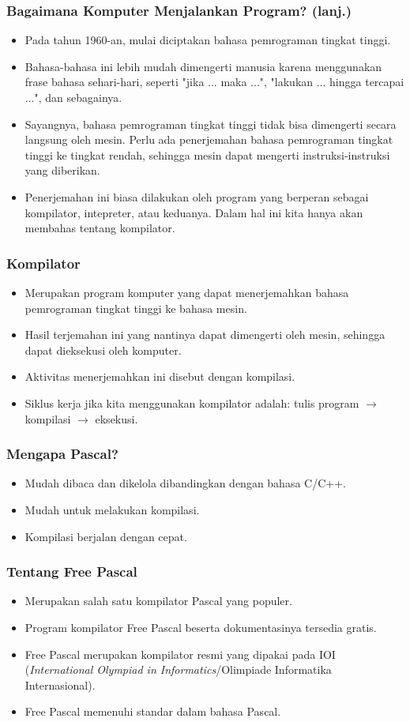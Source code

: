 \documentclass{beamer}
\begin{document}
\begin{frame}
\frametitle{Bagaimana Komputer Menjalankan Program? (lanj.)}
\begin{itemize}
	\item Pada tahun 1960-an, mulai diciptakan bahasa pemrograman tingkat tinggi.
	\item Bahasa-bahasa ini lebih mudah dimengerti manusia karena menggunakan frase bahasa sehari-hari, seperti "jika ... maka ...", "lakukan ... hingga tercapai ...", dan sebagainya.
	\item Sayangnya, bahasa pemrograman tingkat tinggi tidak bisa dimengerti secara langsung oleh mesin. Perlu ada penerjemahan bahasa pemrograman tingkat tinggi ke tingkat rendah, sehingga mesin dapat mengerti instruksi-instruksi yang diberikan.
	\item Penerjemahan ini biasa dilakukan oleh program yang berperan sebagai kompilator, intepreter, atau keduanya. Dalam hal ini kita hanya akan membahas tentang kompilator.
\end{itemize}
\end{frame}

\begin{frame}
\frametitle{Kompilator}
\begin{itemize}
	\item Merupakan program komputer yang dapat menerjemahkan bahasa pemrograman tingkat tinggi ke bahasa mesin.
	\item Hasil terjemahan ini yang nantinya dapat dimengerti oleh mesin, sehingga dapat dieksekusi oleh komputer.
	\item Aktivitas menerjemahkan ini disebut dengan kompilasi.
	\item Siklus kerja jika kita menggunakan kompilator adalah: tulis program $\rightarrow$ kompilasi $\rightarrow$ eksekusi.
\end{itemize}
\end{frame}

\begin{frame}
\frametitle{Mengapa Pascal?}
\begin{itemize}
	\item Mudah dibaca dan dikelola dibandingkan dengan bahasa C/C++.
	\item Mudah untuk melakukan kompilasi.
	\item Kompilasi berjalan dengan cepat.
\end{itemize}
\end{frame}

\begin{frame}
\frametitle{Tentang Free Pascal}
\begin{itemize}
	\item Merupakan salah satu kompilator Pascal yang populer.
	\item Program kompilator Free Pascal beserta dokumentasinya tersedia gratis.
	\item Free Pascal merupakan kompilator resmi yang dipakai pada IOI (\textit{International Olympiad in Informatics}/Olimpiade Informatika Internasional).
	\item Free Pascal memenuhi standar dalam bahasa Pascal.
\end{itemize}
\end{frame}
\end{document}
